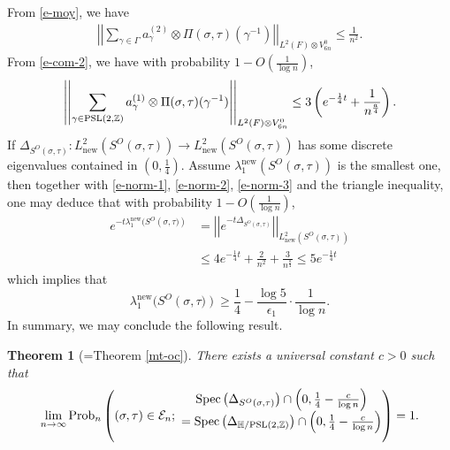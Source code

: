 \documentclass{amsart}
\theoremstyle{plain}
\newtheorem{theorem}{Theorem}[section]
\theoremstyle{definition}
\theoremstyle{remark}
\begin{document}
 From \eqref{e-moy}, we have
 \begin{align}\label{e-norm-2}
\left|\left|\sum\limits_{\gamma\in\Gamma}a_{\gamma}^{(2)}\otimes\Pi(\sigma,\tau)(\gamma^{-1})\right|\right|_{L^2(F)\otimes V_{6n}^0}\leq\frac{1}{n^2}.
 \end{align}
From \eqref{e-com-2}, we have with probability $1-O\left(\frac{1}{\log n}\right)$,
\begin{equation}
    \begin{aligned}\label{e-norm-3}
        \left|\left|\sum\limits_{\gamma\in\textnormal{PSL}(2,\mathbb{Z})}a_\gamma^{(1)}\otimes\Pi(\sigma,\tau)(\gamma^{-1})\right|\right|_{L^2(F)\otimes V_{6n}^0}\leq 3\left(e^{-\frac{1}{4}t}+\frac{1}{n^{\frac{a}{4}}}\right).
    \end{aligned}
\end{equation}
If $\Delta_{S^O(\sigma,\tau)}:L^2_{\text{new}}(S^O(\sigma,\tau))\to L^2_{\text{new}}(S^O(\sigma,\tau))$ has some discrete eigenvalues contained in $(0,\frac{1}{4})$. Assume $\lambda_1^{\text{new}}(S^O(\sigma,\tau))$ is the smallest one, then 
together with \eqref{e-norm-1}, \eqref{e-norm-2}, \eqref{e-norm-3} and the triangle inequality, one may deduce that with probability $1-O\left(\frac{1}{\log n}\right)$,
\begin{align*}
    e^{-t\lambda_1^{\text{new}}(S^O\left(\sigma,\tau)\right)}&=\left|\left|e^{-t\Delta_{S^O(\sigma,\tau)}}\right|\right|_{L^2_{\text{new}}(S^O(\sigma,\tau))}\\
    &\leq 4e^{-\frac{1}{4}t}+\frac{2}{n^2}+\frac{3}{n^{\frac{a}{4}}} \leq 5e^{-\frac{1}{4}t}
\end{align*}
which implies that 
$$\lambda_1^{\text{new}}(S^O\left(\sigma,\tau)\right)\geq \frac{1}{4}-\frac{\log 5}{\epsilon_1}\cdot\frac{1}{\log n}.$$
In summary, we may conclude the following result.
\begin{theorem}[=Theorem \ref{mt-oc}]
    There exists a universal constant $c>0$ such that
    $$\lim\limits_{n\to\infty}\textnormal{Prob}_n\left((\sigma,\tau)\in\mathcal{E}_n;\ \begin{matrix}
        \textnormal{Spec}\left(\Delta_{S^{O}(\sigma,\tau)}\right)\cap\left(0,\frac{1}{4}-\frac{c}{\log n}\right)\\
       \vspace{0.3cm} =\textnormal{Spec}\left(\Delta_{\mathbb{H}/\textnormal{PSL}(2,\mathbb{Z})}\right)\cap\left(0,\frac{1}{4}-\frac{c}{\log n}\right)
    \end{matrix}\right)=1.$$
\end{theorem}



\end{document}
